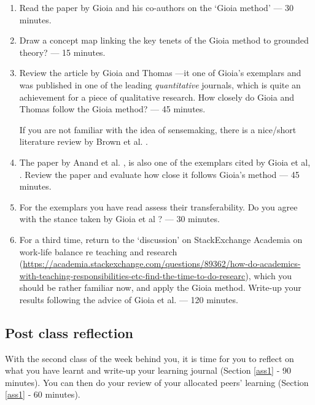 \documentclass[]{book}
\theoremstyle{definition}
\theoremstyle{definition}
\theoremstyle{definition}
\theoremstyle{remark}
\begin{document}
\begin{enumerate}
\def\labelenumi{\arabic{enumi}.}
\item
  Read the paper by Gioia and his co-authors on the `Gioia method'
  \autocite{gioia_2013_seekingqualitativerigor} --- 30 minutes.
\item
  Draw a concept map linking the key tenets of the Gioia method to
  grounded theory? --- 15 minutes.
\item
  Review the article by Gioia and Thomas
  \autocite*{gioia_1996_identityimageissuea}---it one of Gioia's
  exemplars and was published in one of the leading \emph{quantitative}
  journals, which is quite an achievement for a piece of qualitative
  research. How closely do Gioia and Thomas follow the Gioia method? ---
  45 minutes.

  If you are not familiar with the idea of sensemaking, there is a
  nice/short literature review by Brown et al.
  \autocite{brown_2015_makingsensesensemaking}.
\item
  The paper by Anand et al.
  \autocite{anand_2007_knowledgebasedinnovationemergence}, is also one
  of the exemplars cited by Gioia et al,
  \autocite*{gioia_2013_seekingqualitativerigor}. Review the paper and
  evaluate how close it follows Gioia's method --- 45 minutes.
\item
  For the exemplars you have read assess their transferability. Do you
  agree with the stance taken by Gioia et al
  \autocite*{gioia_2013_seekingqualitativerigor}? --- 30 minutes.
\item
  For a third time, return to the `discussion' on StackExchange Academia
  on work-life balance re teaching and research
  (\url{https://academia.stackexchange.com/questions/89362/how-do-academics-with-teaching-responsibilities-etc-find-the-time-to-do-researc}),
  which you should be rather familiar now, and apply the Gioia method.
  Write-up your results following the advice of Gioia et al.
  \autocite*{gioia_2013_seekingqualitativerigor} --- 120 minutes.
\end{enumerate}

\hypertarget{post-class-reflection-9}{%
\subsection*{Post class reflection}\label{post-class-reflection-9}}

With the second class of the week behind you, it is time for you to
reflect on what you have learnt and write-up your learning journal
(Section \ref{ass1} ‐ 90 minutes). You can then do your review of your
allocated peers' learning (Section \ref{ass1} ‐ 60 minutes).
\end{document}
